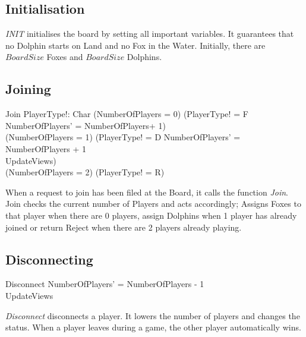 \documentclass[a4paper,twoside,11pt]{book}
\begin{document}
\subsection{Initialisation} %
\label{sub:initialisation}

\emph{INIT} initialises the board by setting all important variables. It guarantees that no Dolphin starts on Land and no Fox in the Water. Initially, there are $BoardSize$ Foxes and $BoardSize$ Dolphins.



\subsection{Joining} %
\label{sub:joining}

\begin{schema}{Join}
  PlayerType!: Char
  \ST
  (NumberOfPlayers = 0) \Rightarrow (PlayerType! = F \wedge NumberOfPlayers' = NumberOfPlayers+ 1) \\
  (NumberOfPlayers = 1) \Rightarrow (PlayerType! = D \wedge NumberOfPlayers' = NumberOfPlayers + 1 \wedge\\ UpdateViews) \\
  (NumberOfPlayers = 2) \Rightarrow (PlayerType! = R)
\end{schema}

When a request to join has been filed at the Board, it calls the function \emph{Join}.
Join checks the current number of Players and acts accordingly; Assigns Foxes to that player when there are 0 players, assign Dolphins when 1 player has already joined or return Reject when there are 2 players already playing.


\subsection{Disconnecting} %
\label{sub:disconnecting}

\begin{schema}{Disconnect}
  \ST
  NumberOfPlayers' = NumberOfPlayers - 1 \\
  UpdateViews \\
\end{schema}

\emph{Disconnect} disconnects a player. It lowers the number of players and changes the status. When a player leaves during a game, the other player automatically wins.
\end{document}

